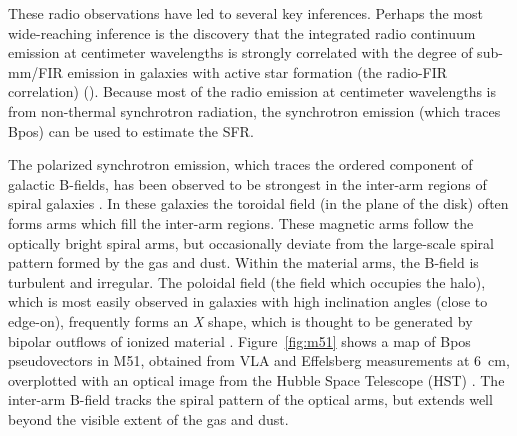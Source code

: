 These radio observations have led to several key inferences. Perhaps the most wide-reaching inference is the discovery that the integrated radio continuum emission at centimeter wavelengths is strongly correlated with the degree of sub-mm/FIR emission in galaxies with active star formation (the radio-FIR correlation) (\citet{de1985astronomy,beck2008measuring}). Because most of the radio emission at centimeter wavelengths is from non-thermal synchrotron radiation, the synchrotron emission (which traces \gls{Bpos}) can be used to estimate the SFR.

The polarized synchrotron emission, which traces the ordered component of galactic B-fields, has been observed to be strongest in the inter-arm regions of spiral galaxies \citep{beck2016magnetic}. In these galaxies the toroidal field (in the plane of the disk) often forms arms which fill the inter-arm regions. These magnetic arms follow the optically bright spiral arms, but occasionally deviate from the large-scale spiral pattern formed by the gas and dust. Within the material arms, the B-field is turbulent and irregular. The poloidal field (the field which occupies the halo), which is most easily observed in galaxies with high inclination angles (close to edge-on), frequently forms an \textit{X} shape, which is thought to be generated by bipolar outflows of ionized material \citep{ferriere2014analytical}. Figure~\ref{fig:m51} shows a map of \gls{Bpos} pseudovectors in M51, obtained from VLA and Effelsberg measurements at 6~cm, overplotted with an optical image from the Hubble Space Telescope (HST) \citep{fletcher2011magnetic}. The inter-arm B-field tracks the spiral pattern of the optical arms, but extends well beyond the visible extent of the gas and dust.

